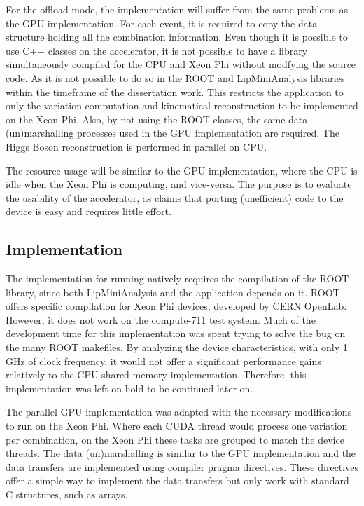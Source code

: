 For the offload mode, the implementation will suffer from the same problems as the GPU implementation. For each event, it is required to copy the data structure holding all the combination information. Even though it is possible to use C++ classes on the accelerator, it is not possible to have a library simultaneously compiled for the CPU and Xeon Phi without modfying the source code. As it is not possible to do so in the ROOT and LipMiniAnalysis libraries within the timeframe of the dissertation work. This restricts the application to only the variation computation and kinematical reconstruction to be implemented on the Xeon Phi. Also, by not using the ROOT classes, the same data (un)marshalling processes used in the GPU implementation are required. The Higgs Boson reconstruction is performed in parallel on CPU.

The resource usage will be similar to the GPU implementation, where the CPU is idle when the Xeon Phi is computing, and vice-versa. The purpose is to evaluate the usability of the accelerator, as \intel claims that porting (unefficient) code to the device is easy and requires little effort.

\subsection{Implementation}
\label{MICImplementation}

The implementation for running natively requires the compilation of the ROOT library, since both LipMiniAnalysis and the application depends on it. ROOT offers specific compilation for \intel Xeon Phi devices, developed by CERN OpenLab. However, it does not work on the compute-711 test system. Much of the development time for this implementation was spent trying to solve the bug on the many ROOT makefiles. By analyzing the device characteristics, with only 1 GHz of clock frequency, it would not offer a significant performance gains relatively to the CPU shared memory implementation. Therefore, this implementation was left on hold to be continued later on.

The parallel GPU implementation was adapted with the necessary modifications to run on the Xeon Phi. Where each CUDA thread would process one variation per combination, on the Xeon Phi these tasks are grouped to match the device threads. The data (un)marshalling is similar to the GPU implementation and the data transfers are implemented using compiler pragma directives. These directives offer a simple way to implement the data transfers but only work with standard C structures, such as arrays.


